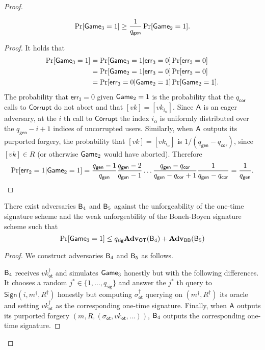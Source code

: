 \begin{proof}
\begin{lemma}
$$
\Pr[\mathsf{Game}_3=1]\geq \frac{1}{{q_\mathsf{gen}}}\Pr[\mathsf{Game}_2=1].
$$
\end{lemma}
\begin{proof}
It holds that
\begin{align*}
\Pr[\mathsf{Game}_3=1] &= \Pr[\mathsf{Game}_3=1|\mathsf{err}_3=0]\Pr[\mathsf{err}_3=0]\\
&=\Pr[\mathsf{Game}_2=1|\mathsf{err}_3=0]\Pr[\mathsf{err}_3=0]\\
&=\Pr[\mathsf{err}_3=0|\mathsf{Game}_2=1]\Pr[\mathsf{Game}_2=1].
\end{align*}
The probability that $\mathsf{err}_3=0$ given $\mathsf{Game}_2=1$ is the probability that the ${q_\mathsf{cor}}$ calls to $\mathsf{Corrupt}$ do not abort and that $[vk]=[vk_{i_\alpha}]$. Since $\mathsf{A}$ is an eager adversary, at the $i$ th call to $\mathsf{Corrupt}$ the index $i_\alpha$ is uniformly distributed over the ${q_\mathsf{gen}}-i+1$ indices of uncorrupted users. Similarly, when $\mathsf{A}$ outputs its purported forgery, the probability that $[vk]=[vk_{i_\alpha}]$ is $1/({q_\mathsf{gen}}-{q_\mathsf{cor}})$, since $[vk]\in R$ (or otherwise $\mathsf{Game}_2$ would have aborted). Therefore
$$
\Pr[\mathsf{err}_2=1|\mathsf{Game}_2=1]=\frac{{q_\mathsf{gen}}-1}{{q_\mathsf{gen}}}\frac{{q_\mathsf{gen}}-2}{{q_\mathsf{gen}}-1}\ldots\frac{{q_\mathsf{gen}}-{q_\mathsf{cor}}}{{q_\mathsf{gen}}-{q_\mathsf{cor}}+1}\frac{1}{{q_\mathsf{gen}}-{q_\mathsf{cor}}}=\frac{1}{{q_\mathsf{gen}}}.
$$ 
\end{proof}

\begin{lemma}  There exist adversaries $\mathsf{B}_4$ and $\mathsf{B}_5$ against the unforgeability of the one-time signature scheme and the weak unforgeability of the Boneh-Boyen signature scheme such that
$$
\Pr[\mathsf{Game}_3=1]\leq q_\mathsf{sig}\mathbf{Adv}_{\mathsf{OT}}(\mathsf{B}_4)+\mathbf{Adv}_{\mathsf{BB}}(\mathsf{B}_5)
$$
\end{lemma}
\begin{proof}
We construct adversaries $\mathsf{B}_4$ and $\mathsf{B}_5$ as follows.

$\mathsf{B}_4$ receives $vk_\mathsf{ot}^\dag$ and simulates $\mathsf{Game}_3$ honestly but with the following differences. It chooses a random $j^*\in\{1,\ldots, q_\mathsf{sig}\}$ and answer the $j^*$ th query to $\mathsf{Sign}(i,m^\dag,R^\dag)$ honestly but computing $\sigma_\mathsf{ot}^\dag$ querying on $(m^\dag,R^\dag)$ its oracle and setting $vk_\mathsf{ot}^\dag$ as the corresponding one-time signature. Finally, when $\mathsf{A}$ outputs its purported forgery $(m,R,(\sigma_\mathsf{ot},vk_\mathsf{ot},\ldots))$, $\mathsf{B}_4$ outputs the corresponding one-time signature.


\end{proof}
\end{proof}

